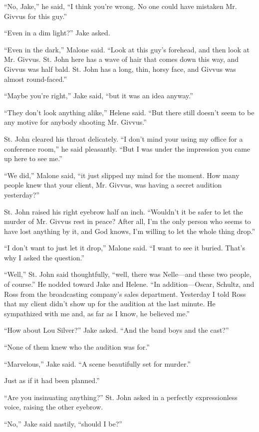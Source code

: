 \documentclass{novel}
\begin{document}
“No, Jake,” he said, “I think you’re wrong. No one could have mistaken Mr. Givvus for this guy.”

“Even in a dim light?” Jake asked.

“Even in the dark,” Malone said. “Look at this guy’s forehead, and then look at Mr. Givvus. St. John here has a wave of hair that comes down this way, and Givvus was half bald. St. John has a long, thin, horsy face, and Givvus was almost round-faced.”

“Maybe you’re right,” Jake said, “but it was an idea anyway.”

“They don’t look anything alike,” Helene said. “But there still doesn’t seem to be any motive for anybody shooting Mr. Givvus.”

St. John cleared his throat delicately. “I don’t mind your using my office for a conference room,” he said pleasantly. “But I was under the impression you came up here to see me.”

“We did,” Malone said, “it just slipped my mind for the moment. How many people knew that your client, Mr. Givvus, was having a secret audition yesterday?”

St. John raised his right eyebrow half an inch. “Wouldn’t it be safer to let the murder of Mr. Givvus rest in peace? After all, I’m the only person who seems to have lost anything by it, and God knows, I’m willing to let the whole thing drop.”

“I don’t want to just let it drop,” Malone said. “I want to see it buried. That’s why I asked the question.”

“Well,” St. John said thoughtfully, “well, there was Nelle—and these two people, of course.” He nodded toward Jake and Helene. “In addition—Oscar, Schultz, and Ross from the broadcasting company’s sales department. Yesterday I told Ross that my client didn’t show up for the audition at the last minute. He sympathized with me and, as far as I know, he believed me.”

“How about Lou Silver?” Jake asked. “And the band boys and the cast?”

“None of them knew who the audition was for.”

“Marvelous,” Jake said. “A scene beautifully set for murder.”

Just as if it had been planned.”

“Are you insinuating anything?” St. John asked in a perfectly expressionless voice, raising the other eyebrow.

“No,” Jake said nastily, “should I be?”
\end{document}
